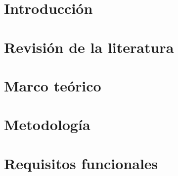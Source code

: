 \documentclass[12pt, spanish]{report}
\begin{document}
	\setlength{\parskip}{0.6em}
	\begin{justify}
	\chapter{Introducción}
	
	
	\chapter{Revisión de la literatura}
	
	
	\chapter{Marco teórico}
	
	
	\chapter{Metodología}
	
	
	\titlespacing*{\chapter}{0pt}{-50pt}{20pt}

	
	
	\end{justify}
	
	\appendix
	\appendixpage
	\chapter{Requisitos funcionales}

	
\end{document}
